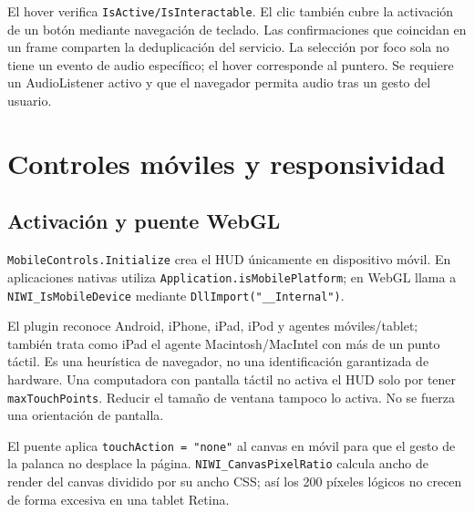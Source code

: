 \documentclass[11pt,letterpaper,oneside]{article}
\newcommand{\code}[1]{\nolinkurl{#1}}
\begin{document}
El hover verifica \code{IsActive/IsInteractable}. El clic también cubre la activación de un botón mediante navegación de teclado. Las confirmaciones que coincidan en un frame comparten la deduplicación del servicio. La selección por foco sola no tiene un evento de audio específico; el hover corresponde al puntero. Se requiere un AudioListener activo y que el navegador permita audio tras un gesto del usuario.

\section{Controles móviles y responsividad}
\subsection{Activación y puente WebGL}
\code{MobileControls.Initialize} crea el HUD únicamente en dispositivo móvil. En aplicaciones nativas utiliza \code{Application.isMobilePlatform}; en WebGL llama a \code{NIWI_IsMobileDevice} mediante \code{DllImport("__Internal")}.

El plugin reconoce Android, iPhone, iPad, iPod y agentes móviles/tablet; también trata como iPad el agente Macintosh/MacIntel con más de un punto táctil. Es una heurística de navegador, no una identificación garantizada de hardware. Una computadora con pantalla táctil no activa el HUD solo por tener \code{maxTouchPoints}. Reducir el tamaño de ventana tampoco lo activa. No se fuerza una orientación de pantalla.

El puente aplica \code{touchAction = "none"} al canvas en móvil para que el gesto de la palanca no desplace la página. \code{NIWI_CanvasPixelRatio} calcula ancho de render del canvas dividido por su ancho CSS; así los 200 píxeles lógicos no crecen de forma excesiva en una tablet Retina.
\end{document}
